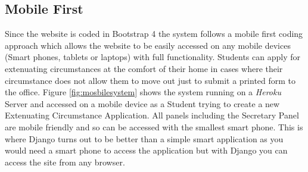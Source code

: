 \documentclass[../main.tex]{subfiles}
\begin{document}
\subsection*{Mobile First}
Since the website is coded in Bootstrap 4\cite{bootstrapfour} the system follows a mobile first coding approach which allows the website to be easily accessed on any mobile devices (Smart phones, tablets or laptops) with full functionality. Students can apply for extenuating circumstances at the comfort of their home in cases where their circumstance does not allow them to move out just to submit a printed form to the office. Figure \ref{fig:mosbilesystem} shows the system running on a \textit{Heroku} Server and accessed on a mobile device as a Student trying to create a new Extenuating Circumstance Application. All panels including the Secretary Panel are mobile friendly and so can be accessed with the smallest smart phone. This is where Django turns out to be better than a simple smart application as you would need a smart phone to access the application but with Django you can access the site from any browser.
\end{document}
